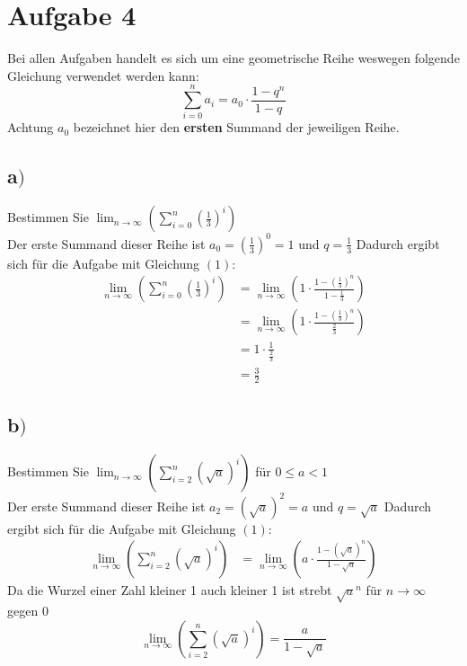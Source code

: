 \documentclass[18pt,a4paper]{article}
\begin{document}
\section*{Aufgabe 4}
Bei allen Aufgaben handelt es sich um eine geometrische Reihe weswegen folgende Gleichung verwendet werden kann:
\begin{equation}
\sum_{i=0}^{n}a_i = a_0 \cdot \frac{1-q^n}{1-q}
\end{equation}
Achtung $a_0$ bezeichnet hier den \textbf{ersten} Summand der jeweiligen Reihe.
\subsection*{a$)$}
Bestimmen Sie $\displaystyle \lim_{n \to \infty}\left(\sum_{i=0}^{n}\left(\frac{1}{3}\right)^i\right) $\\[5pt]
Der erste Summand dieser Reihe ist $a_0 = \left(\frac{1}{3}\right)^0 = 1$ und $ q = \frac{1}{3}$ Dadurch ergibt sich f\"ur die Aufgabe mit Gleichung $(1)$:\\[5pt]
\begin{align*}
\displaystyle \lim_{n \to \infty}\left(\sum_{i=0}^{n}\left(\frac{1}{3}\right)^i\right) &= \lim_{n \to \infty}\left(1 \cdot \frac{1-\left(\frac{1}{3}\right)^n}{1-\frac{1}{3}}\right)\\[5pt]
&=\lim_{n \to \infty}\left(1 \cdot \frac{1-\left(\frac{1}{3}\right)^n}{\frac{2}{3}}\right)\\[5pt]
&= 1 \cdot \frac{1}{\frac{2}{3}}\\[5pt]
&= \frac{3}{2}
\end{align*}

\subsection*{b$)$}
Bestimmen Sie $\displaystyle \lim_{n \to \infty}\left(\sum_{i=2}^{n}\left(\sqrt{a}\right)^i\right) $ f\"ur $0 \leq a < 1$\\[5pt]
Der erste Summand dieser Reihe ist $a_2 = \left(\sqrt{a}\right)^2 = a$ und $ q = \sqrt{a}$ Dadurch ergibt sich f\"ur die Aufgabe mit Gleichung $(1)$:\\[5pt]
\begin{align*}
\displaystyle \lim_{n \to \infty}\left(\sum_{i=2}^{n}\left(\sqrt{a}\right)^i\right) &=\lim_{n \to \infty}\left(a \cdot \frac{1-\left(\sqrt{a}\right)^n}{1-\sqrt{a}}\right)
\end{align*}
Da die Wurzel einer Zahl kleiner 1 auch kleiner 1 ist strebt $\sqrt{a}^n$ f\"ur $n\to \infty$ gegen 0
\begin{equation*}
\displaystyle \lim_{n \to \infty}\left(\sum_{i=2}^{n}\left(\sqrt{a}\right)^i\right) = \frac{a}{1-\sqrt{a}}
\end{equation*}
\end{document}
